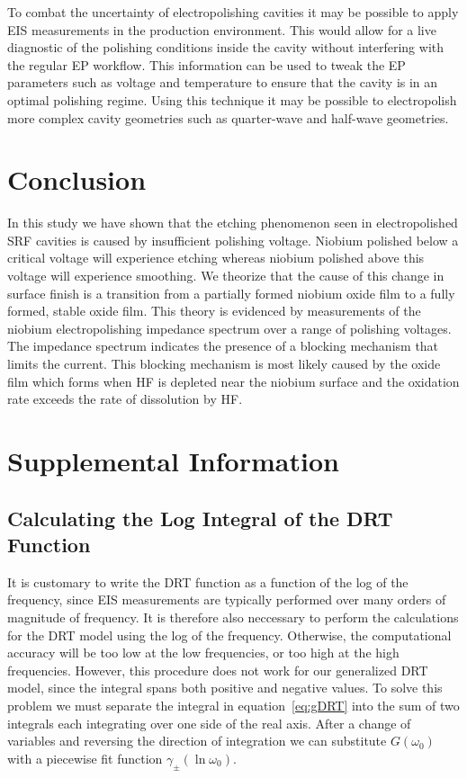 \documentclass{revtex4-2}
\begin{document}
To combat the uncertainty of electropolishing cavities it may be possible to apply EIS measurements in the production environment. This would allow for a live diagnostic of the polishing conditions inside the cavity without interfering with the regular EP workflow. This information can be used to tweak the EP parameters such as voltage and temperature to ensure that the cavity is in an optimal polishing regime. Using this technique it may be possible to electropolish more complex cavity geometries such as quarter-wave and half-wave geometries.



\section{Conclusion}
\label{sec:org57282ed}
In this study we have shown that the etching phenomenon seen in electropolished SRF cavities is caused by insufficient polishing voltage. Niobium polished below a critical voltage will experience etching whereas niobium polished above this voltage will experience smoothing. We theorize that the cause of this change in surface finish is a transition from a partially formed niobium oxide film to a fully formed, stable oxide film. This theory is evidenced by measurements of the niobium electropolishing impedance spectrum over a range of polishing voltages. The impedance spectrum indicates the presence of a blocking mechanism that limits the current. This blocking mechanism is most likely caused by the oxide film which forms when HF is depleted near the niobium surface and the oxidation rate exceeds the rate of dissolution by HF.


\section{Supplemental Information}
\label{sec:sup}

\subsection{Calculating the Log Integral of the DRT Function}

It is customary to write the DRT function as a function of the log of the frequency, since EIS measurements are typically performed over many orders of magnitude of frequency. It is therefore also neccessary to perform the calculations for the DRT model using the log of the frequency. Otherwise, the computational accuracy will be too low at the low frequencies, or too high at the high frequencies. However, this procedure does not work for our generalized DRT model, since the integral spans both positive and negative values. To solve this problem we must separate the integral in equation~\ref{eq:gDRT} into the sum of two integrals each integrating over one side of the real axis. After a change of variables and reversing the direction of integration we can substitute $G\left(\omega_0\right)$ with a piecewise fit function $\gamma_{\pm}\left(\ln\omega_0\right)$.
\end{document}
